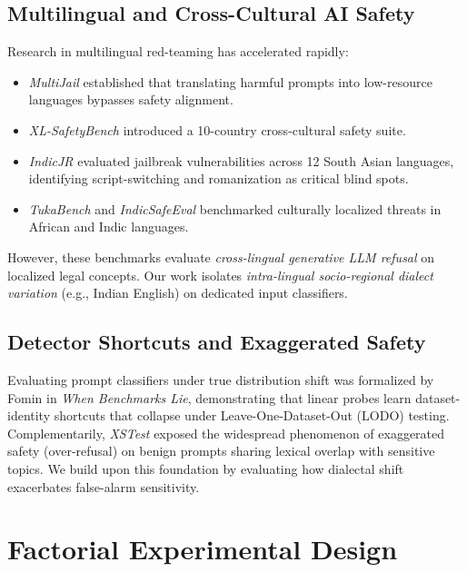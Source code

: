 \documentclass[11pt,a4paper]{article}
\begin{document}
\subsection{Multilingual and Cross-Cultural AI Safety}
Research in multilingual red-teaming has accelerated rapidly:
\begin{itemize}
    \item \textit{MultiJail} \cite{deng2024multilingual} established that translating harmful prompts into low-resource languages bypasses safety alignment.
    \item \textit{XL-SafetyBench} \cite{choi2026xlsafetybench} introduced a 10-country cross-cultural safety suite.
    \item \textit{IndicJR} \cite{pattnayak2026indicjr} evaluated jailbreak vulnerabilities across 12 South Asian languages, identifying script-switching and romanization as critical blind spots.
    \item \textit{TukaBench} \cite{akinode2026tukabench} and \textit{IndicSafeEval} \cite{mondal2026indicsafeeval} benchmarked culturally localized threats in African and Indic languages.
\end{itemize}
However, these benchmarks evaluate \textit{cross-lingual generative LLM refusal} on localized legal concepts. Our work isolates \textit{intra-lingual socio-regional dialect variation} (e.g., Indian English) on dedicated input classifiers.

\subsection{Detector Shortcuts and Exaggerated Safety}
Evaluating prompt classifiers under true distribution shift was formalized by Fomin \cite{fomin2026whenbenchmarkslie} in \textit{When Benchmarks Lie}, demonstrating that linear probes learn dataset-identity shortcuts that collapse under Leave-One-Dataset-Out (LODO) testing. Complementarily, \textit{XSTest} \cite{rottger2024xstest} exposed the widespread phenomenon of exaggerated safety (over-refusal) on benign prompts sharing lexical overlap with sensitive topics. We build upon this foundation by evaluating how dialectal shift exacerbates false-alarm sensitivity.

\section{Factorial Experimental Design}
\label{sec:design}
\end{document}
